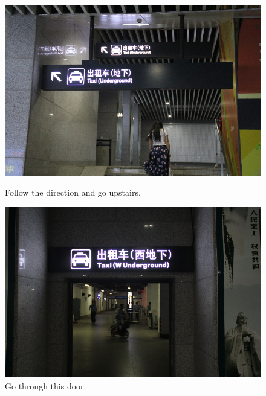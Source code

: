 \documentclass[11pt]{article}
\begin{document}
  \begin{figure}[!h]
	\begin{minipage}[t]{.5\textwidth}
     	\centering
        	\includegraphics[scale=0.27]{IMG_7197.jpg}
		\caption{Follow the direction and go upstairs.\label{7197}}
	\end{minipage}%
     \begin{minipage}[t]{.5\textwidth}
         \centering
         \includegraphics[scale=0.27]{IMG_7199.jpg}
         \caption{Go through this door.\label{7199}}
    \end{minipage}%
 \end{figure}
\end{document}
